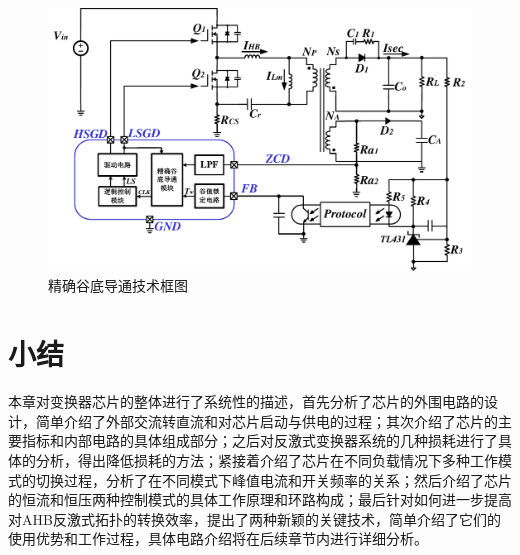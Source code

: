 
\begin{figure}[htbp] 
    \centering
    \includegraphics[width=0.8\linewidth]{figures/精确谷底导通技术框图.pdf}
    \caption{精确谷底导通技术框图}
    \label{fig:精确谷底导通技术框图}
\end{figure}



\section{小结}

本章对变换器芯片的整体进行了系统性的描述，首先分析了芯片的外围电路的设计，简单介绍了外部交流转直流和对芯片启动与供电的过程；其次介绍了芯片的主要指标和内部电路的具体组成部分；之后对反激式变换器系统的几种损耗进行了具体的分析，得出降低损耗的方法；紧接着介绍了芯片在不同负载情况下多种工作模式的切换过程，分析了在不同模式下峰值电流和开关频率的关系；然后介绍了芯片的恒流和恒压两种控制模式的具体工作原理和环路构成；最后针对如何进一步提高对AHB反激式拓扑的转换效率，提出了两种新颖的关键技术，简单介绍了它们的使用优势和工作过程，具体电路介绍将在后续章节内进行详细分析。


